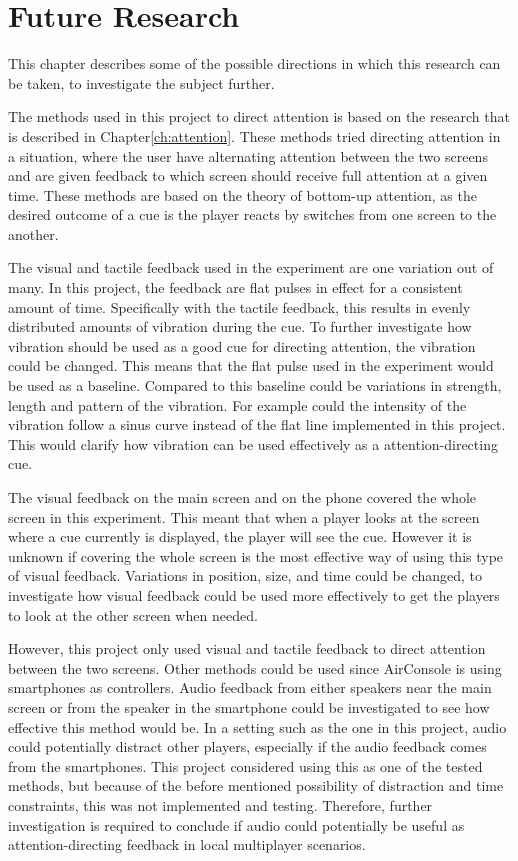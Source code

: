 \chapter{Future Research}\label{sec:future_research}
This chapter describes some of the possible directions in which this research can be taken, to investigate the subject further. 

The methods used in this project to direct attention is based on the research that is described in Chapter\ref{ch:attention}. These methods tried directing attention in a situation, where the user have alternating attention between the two screens and are given feedback to which screen should receive full attention at a given time. These methods are based on the theory of bottom-up attention, as the desired outcome of a cue is the player reacts by switches from one screen to the another.

The visual and tactile feedback used in the experiment are one variation out of many. In this project, the feedback are flat pulses in effect for a consistent amount of time. Specifically with the tactile feedback, this results in evenly distributed amounts of vibration during the cue. To further investigate how vibration should be used as a good cue for directing attention, the vibration could be changed. This means that the flat pulse used in the experiment would be used as a baseline. Compared to this baseline could be variations in strength, length and pattern of the vibration. For example could the intensity of the vibration follow a sinus curve instead of the flat line implemented in this project. This would clarify how vibration can be used effectively as a attention-directing cue.

The visual feedback on the main screen and on the phone covered the whole screen in this experiment. This meant that when a player looks at the screen where a cue currently is displayed, the player will see the cue. However it is unknown if covering the whole screen is the most effective way of using this type of visual feedback. Variations in position, size, and time could be changed, to investigate how visual feedback could be used more effectively to get the players to look at the other screen when needed.

However, this project only used visual and tactile feedback to direct attention between the two screens. Other methods could be used since AirConsole is using smartphones as controllers. Audio feedback from either speakers near the main screen or from the speaker in the smartphone could be investigated to see how effective this method would be. In a setting such as the one in this project, audio could potentially distract other players, especially if the audio feedback comes from the smartphones. This project considered using this as one of the tested methods, but because of the before mentioned possibility of distraction and time constraints, this was not implemented and testing. Therefore, further investigation is required to conclude if audio could potentially be useful as attention-directing feedback in local multiplayer scenarios.

